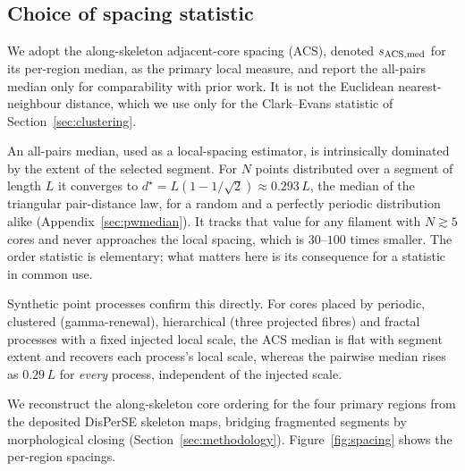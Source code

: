 \documentclass[usenatbib,twoside,twocolumn]{mnras}
\begin{document}
\subsection{Choice of spacing statistic}
\label{sec:statistics}

We adopt the along-skeleton adjacent-core spacing (ACS), denoted $s_{\rm ACS,med}$ for its per-region median, as the primary local measure, and report the all-pairs median only for comparability with prior work. It is not the Euclidean nearest-neighbour distance, which we use only for the Clark--Evans statistic of Section~\ref{sec:clustering}.

An all-pairs median, used as a local-spacing estimator, is intrinsically dominated by the extent of the selected segment. For $N$ points distributed over a segment of length $L$ it converges to $d^\star=L(1-1/\sqrt{2})\approx0.293\,L$, the median of the triangular pair-distance law, for a random and a perfectly periodic distribution alike (Appendix~\ref{sec:pwmedian}). It tracks that value for any filament with $N\gtrsim5$ cores and never approaches the local spacing, which is $30$--$100$ times smaller. The order statistic is elementary; what matters here is its consequence for a statistic in common use.

Synthetic point processes confirm this directly. For cores placed by periodic, clustered (gamma-renewal), hierarchical (three projected fibres) and fractal processes with a fixed injected local scale, the ACS median is flat with segment extent and recovers each process's local scale, whereas the pairwise median rises as $0.29\,L$ for \emph{every} process, independent of the injected scale.

We reconstruct the along-skeleton core ordering for the four primary regions from the deposited DisPerSE skeleton maps, bridging fragmented segments by morphological closing (Section~\ref{sec:methodology}). Figure~\ref{fig:spacing} shows the per-region spacings.
\end{document}
